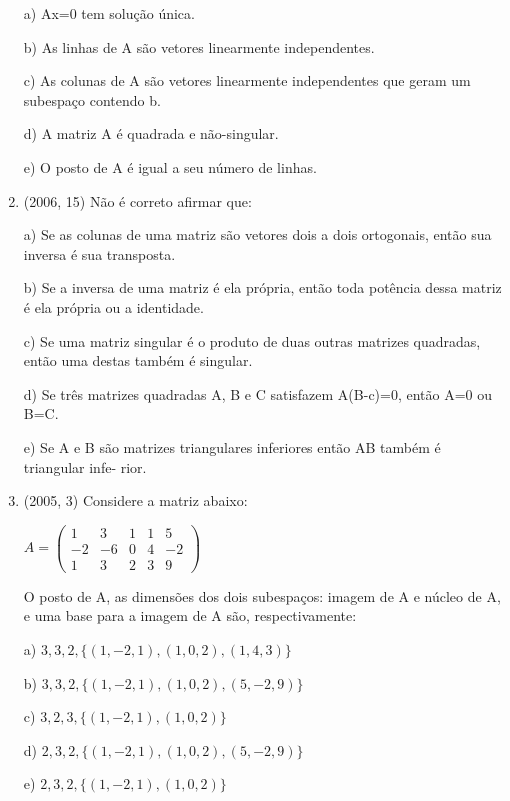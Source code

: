 \documentclass{article}
\begin{document}
\begin{enumerate}
a) Ax=0 tem solução única.

b) As linhas de A são vetores linearmente independentes.

c) As colunas de A são vetores linearmente independentes que geram um subespaço contendo b.

d) A matriz A é quadrada e não-singular.

e) O posto de A é igual a seu número de linhas. \newline






\item(2006, 15) Não é correto afirmar que:

a) Se as colunas de uma matriz são vetores dois a dois ortogonais, então sua inversa é sua transposta.

b) Se a inversa de uma matriz é ela própria, então toda potência dessa matriz é ela própria ou a identidade.

c) Se uma matriz singular é o produto de duas outras matrizes quadradas, então uma destas também é singular.

d) Se três matrizes quadradas A, B e C satisfazem A(B-c)=0, então A=0 ou B=C.

e) Se A e B são matrizes triangulares inferiores então AB também é triangular infe- rior.\newline






\item(2005, 3) Considere a matriz abaixo:


$A=\left(\begin{array}{rrrrr}{1} & {3} & {1} & {1} & {5} \\ {-2} & {-6} & {0} & {4} & {-2} \\ {1} & {3} & {2} & {3} & {9}\end{array}\right)$

O posto de A, as dimensões dos dois subespaços: imagem de A e núcleo de A, e uma base para a imagem de A são, respectivamente:

a) $3,3,2,\{(1,-2,1),(1,0,2),(1,4,3)\}$

b) $3,3,2,\{(1,-2,1),(1,0,2),(5,-2,9)\}$

c) $3,2,3,\{(1,-2,1),(1,0,2)\}$

d) $2,3,2,\{(1,-2,1),(1,0,2),(5,-2,9)\}$

e) $2,3,2,\{(1,-2,1),(1,0,2)\}$ \newline





\end{enumerate}
\end{document}
